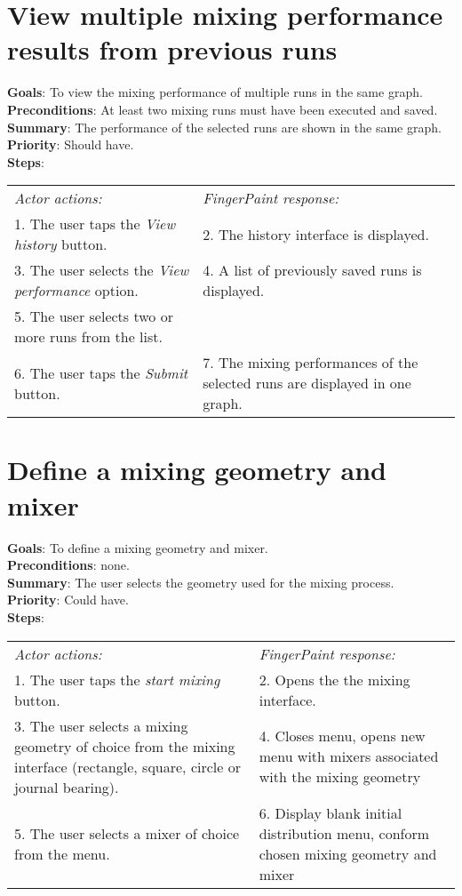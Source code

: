 \begin{appendices}
    \section{View multiple mixing performance results from previous runs}
  \textbf{Goals}: To view the mixing performance of multiple runs in the same graph.\\
  \textbf{Preconditions}: At least two mixing runs must have been executed and saved.\\
  \textbf{Summary}: The performance of the selected runs are shown in the same graph.\\
  \textbf{Priority}: Should have.\\
  \textbf{Steps}: \\
  \begin{tabular}{ p{} p{} }
  	\emph{Actor actions:} & \emph{FingerPaint response:} \\
	   1. The user taps the \emph{View history} button. & 2. The history interface is displayed. \\
	 3. The user selects the \emph{View performance} option. & 4. A list of previously saved runs is displayed.\\
	 5. The user selects two or more runs from the list. & \\
	 6. The user taps the \emph{Submit} button. & 7. The mixing performances of the selected runs are displayed in one graph.\\
  \end{tabular}


\section{Define a mixing geometry and mixer}
  \textbf{Goals}: To define a mixing geometry and mixer.\\
  \textbf{Preconditions}: none.\\
  \textbf{Summary}: The user selects the geometry used for the mixing process.\\
  \textbf{Priority}: Could have.\\
  \textbf{Steps}: \\
  \begin{tabular}{ p{} p{} }
  	\emph{Actor actions:} & \emph{FingerPaint response:} \\
	1. The user taps the \emph{start mixing} button. & 2. Opens the the mixing interface. \\
	3. The user selects a mixing geometry of choice from the mixing interface (rectangle, square, circle or journal bearing). & 4. Closes menu, opens new menu with mixers associated with the mixing geometry\\
	5. The user selects a mixer of choice from the menu. & 6.	Display blank initial distribution menu, conform chosen mixing geometry and mixer\\
  \end{tabular}


\end{appendices}
